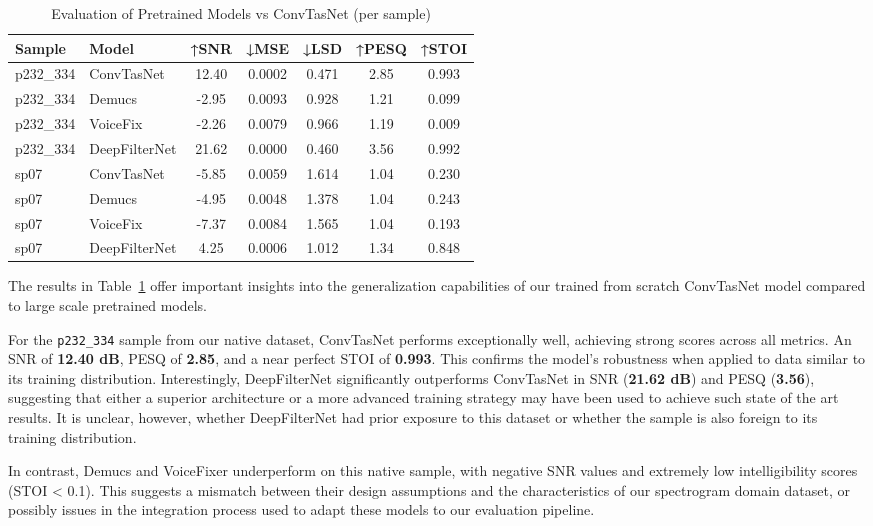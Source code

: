 \vspace{1em}
\begin{table}[H]
\centering
\caption{Evaluation of Pretrained Models vs ConvTasNet (per sample)}
\label{tab:pretrained_eval}
\begin{tabular}{|l|l|c|c|c|c|c|}
\hline
\textbf{Sample} & \textbf{Model} & \textbf{↑SNR} & \textbf{↓MSE} & \textbf{↓LSD} & \textbf{↑PESQ} & \textbf{↑STOI} \\
\hline
p232\_334 & ConvTasNet      & 12.40 & 0.0002 & 0.471 & 2.85 & 0.993 \\
p232\_334 & Demucs          & -2.95 & 0.0093 & 0.928 & 1.21 & 0.099 \\
p232\_334 & VoiceFix        & -2.26 & 0.0079 & 0.966 & 1.19 & 0.009 \\
p232\_334 & DeepFilterNet   & 21.62 & 0.0000 & 0.460 & 3.56 & 0.992 \\
\hline
sp07      & ConvTasNet      & -5.85 & 0.0059 & 1.614 & 1.04 & 0.230 \\
sp07      & Demucs          & -4.95 & 0.0048 & 1.378 & 1.04 & 0.243 \\
sp07      & VoiceFix        & -7.37 & 0.0084 & 1.565 & 1.04 & 0.193 \\
sp07      & DeepFilterNet   & 4.25  & 0.0006 & 1.012 & 1.34 & 0.848 \\
\hline
\end{tabular}
\end{table}


The results in Table~\ref{tab:pretrained_eval} offer important insights into the generalization capabilities of our trained from scratch ConvTasNet model compared to large scale pretrained models.

For the \texttt{p232\_334} sample from our native dataset, ConvTasNet performs exceptionally well, achieving strong scores across all metrics. An SNR of \textbf{12.40 dB}, PESQ of \textbf{2.85}, and a near perfect STOI of \textbf{0.993}. This confirms the model’s robustness when applied to data similar to its training distribution. Interestingly, DeepFilterNet significantly outperforms ConvTasNet in SNR (\textbf{21.62 dB}) and PESQ (\textbf{3.56}), suggesting that either a superior architecture or a more advanced training strategy may have been used to achieve such state of the art results. It is unclear, however, whether DeepFilterNet had prior exposure to this dataset or whether the sample is also foreign to its training distribution.

In contrast, Demucs and VoiceFixer underperform on this native sample, with negative SNR values and extremely low intelligibility scores (STOI < 0.1). This suggests a mismatch between their design assumptions and the characteristics of our spectrogram domain dataset, or possibly issues in the integration process used to adapt these models to our evaluation pipeline.

